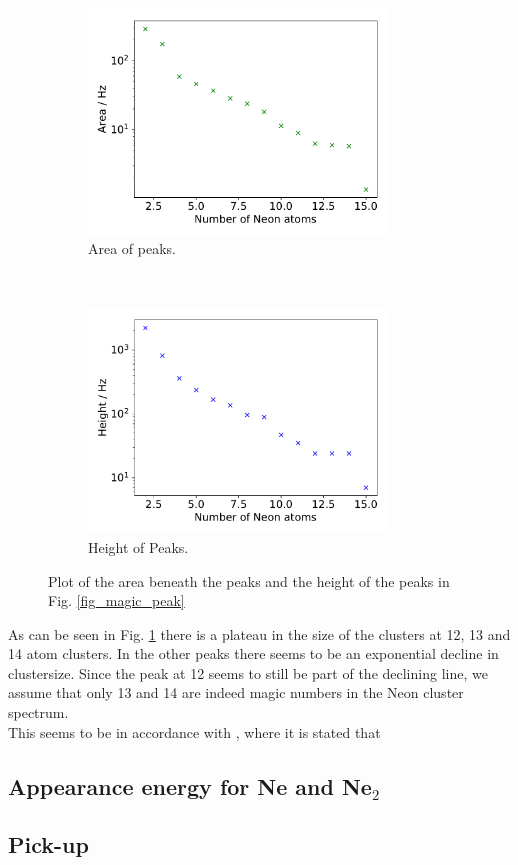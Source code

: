 \documentclass[a4paper,10pt]{article}
\begin{document}
\begin{figure}[H]
  \centering{}
  \begin{subfigure}[t]{0.45 \textwidth}
    \centering
    \includegraphics[height=6cm]{magic_area.pdf}
    \caption{Area of peaks.}
  \end{subfigure}
  ~
  \begin{subfigure}[t]{0.45 \textwidth}
    \centering
    \includegraphics[height=6cm]{magic_height.pdf}
    \caption{Height of Peaks. }
  \end{subfigure}
  \caption{Plot of the area beneath the peaks and the height of the peaks in Fig. \ref{fig_magic_peak}}
  \label{fig_magic_simple}
\end{figure}
As can be seen in Fig. \ref{fig_magic_simple} there is a plateau in the size of the clusters at 12, 13 and 14 atom clusters. In the other peaks there seems to be an exponential decline in clustersize. Since the peak at 12 seems to still be part of the declining line, we assume that only 13 and 14 are indeed magic numbers in the Neon cluster spectrum. \\
This seems to be in accordance with \cite{paper_scheier}, where it is stated that 
\subsection{Appearance energy for Ne and Ne$_2$}
\subsection{Pick-up}
\end{document}
